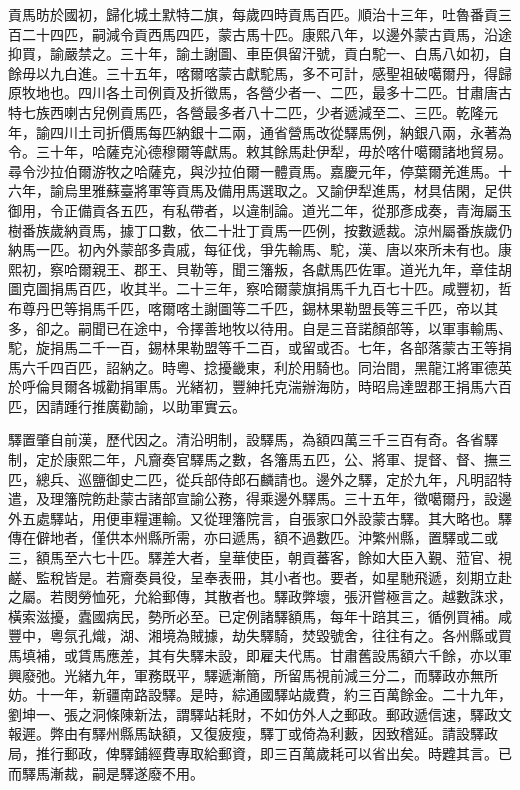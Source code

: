 \begin{pinyinscope}
貢馬昉於國初，歸化城土默特二旗，每歲四時貢馬百匹。順治十三年，吐魯番貢三百二十四匹，嗣減令貢西馬四匹，蒙古馬十匹。康熙八年，以邊外蒙古貢馬，沿途抑買，諭嚴禁之。三十年，諭土謝圖、車臣俱留汗號，貢白駝一、白馬八如初，自餘毋以九白進。三十五年，喀爾喀蒙古獻駝馬，多不可計，感聖祖破噶爾丹，得歸原牧地也。四川各土司例貢及折徵馬，各營少者一、二匹，最多十二匹。甘肅唐古特七族西喇古兒例貢馬匹，各營最多者八十二匹，少者遞減至二、三匹。乾隆元年，諭四川土司折價馬每匹納銀十二兩，通省營馬改從驛馬例，納銀八兩，永著為令。三十年，哈薩克沁德穆爾等獻馬。敕其餘馬赴伊犁，毋於喀什噶爾諸地貿易。尋令沙拉伯爾游牧之哈薩克，與沙拉伯爾一體貢馬。嘉慶元年，停葉爾羌進馬。十六年，諭烏里雅蘇臺將軍等貢馬及備用馬選取之。又諭伊犁進馬，材具佶閑，足供御用，令正備貢各五匹，有私帶者，以違制論。道光二年，從那彥成奏，青海屬玉樹番族歲納貢馬，據丁口數，依二十壯丁貢馬一匹例，按數遞裁。涼州屬番族歲仍納馬一匹。初內外蒙部多貴戚，每征伐，爭先輸馬、駝，漢、唐以來所未有也。康熙初，察哈爾親王、郡王、貝勒等，聞三籓叛，各獻馬匹佐軍。道光九年，章佳胡圖克圖捐馬百匹，收其半。二十三年，察哈爾蒙旗捐馬千九百七十匹。咸豐初，哲布尊丹巴等捐馬千匹，喀爾喀土謝圖等二千匹，錫林果勒盟長等三千匹，帝以其多，卻之。嗣聞已在途中，令擇善地牧以待用。自是三音諾顏部等，以軍事輸馬、駝，旋捐馬二千一百，錫林果勒盟等千二百，或留或否。七年，各部落蒙古王等捐馬六千四百匹，詔納之。時粵、捻擾畿東，利於用騎也。同治間，黑龍江將軍德英於呼倫貝爾各城勸捐軍馬。光緒初，豐紳托克湍辦海防，時昭烏達盟郡王捐馬六百匹，因請踵行推廣勸諭，以助軍實云。

驛置肇自前漢，歷代因之。清沿明制，設驛馬，為額四萬三千三百有奇。各省驛制，定於康熙二年，凡齎奏官驛馬之數，各籓馬五匹，公、將軍、提督、督、撫三匹，總兵、巡鹽御史二匹，從兵部侍郎石麟請也。邊外之驛，定於九年，凡明詔特遣，及理籓院飭赴蒙古諸部宣諭公務，得乘邊外驛馬。三十五年，徵噶爾丹，設邊外五處驛站，用便車糧運輸。又從理籓院言，自張家口外設蒙古驛。其大略也。驛傳在僻地者，僅供本州縣所需，亦曰遞馬，額不過數匹。沖繁州縣，置驛或二或三，額馬至六七十匹。驛差大者，皇華使臣，朝貢蕃客，餘如大臣入覲、蒞官、視鹺、監稅皆是。若齎奏員役，呈奉表冊，其小者也。要者，如星馳飛遞，刻期立赴之屬。若閔勞恤死，允給郵傳，其散者也。驛政弊壞，張汧嘗極言之。越數誅求，橫索滋擾，蠹國病民，勢所必至。已定例諸驛額馬，每年十踣其三，循例買補。咸豐中，粵氛孔熾，湖、湘境為賊據，劫失驛騎，焚毀號舍，往往有之。各州縣或買馬填補，或賃馬應差，其有失驛未設，即雇夫代馬。甘肅舊設馬額六千餘，亦以軍興廢弛。光緒九年，軍務既平，驛遞漸簡，所留馬視前減三分二，而驛政亦無所妨。十一年，新疆南路設驛。是時，綜通國驛站歲費，約三百萬餘金。二十九年，劉坤一、張之洞條陳新法，謂驛站耗財，不如仿外人之郵政。郵政遞信速，驛政文報遲。弊由有驛州縣馬缺額，又復疲瘦，驛丁或倚為利藪，因致稽延。請設驛政局，推行郵政，俾驛鋪經費專取給郵資，即三百萬歲耗可以省出矣。時韙其言。已而驛馬漸裁，嗣是驛遂廢不用。


\end{pinyinscope}
